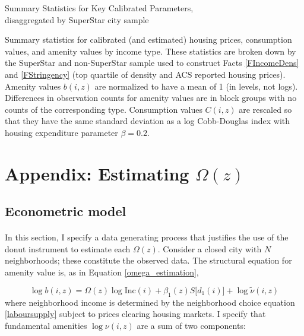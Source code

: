 \documentclass[12pt]{article}
\begin{document}
	\clearpage
	\begin{table}[htbp]
		\caption{Summary Statistics for Key Calibrated Parameters, \\ disaggregated by SuperStar city sample}\label{table:CalibParaSuperstar}
		\makebox[\textwidth]{}
		\caption*{Summary statistics for calibrated (and estimated) housing prices, consumption values, and amenity values by income type. These statistics are broken down by the SuperStar and non-SuperStar sample used to construct Facts \ref{FIncomeDens} and \ref{FStringency} (top quartile of density and ACS reported housing prices). Amenity values $b(i, z)$ are normalized to have a mean of 1 (in levels, not logs). Differences in observation counts for amenity values are in block groups with no counts of the corresponding type. Consumption values $C(i, z)$ are rescaled so that they have the same standard deviation as a log Cobb-Douglas index with housing expenditure parameter $\beta = 0.2$.}
	\end{table}
	
	
	\clearpage
	
	\section{Appendix: Estimating $\Omega(z)$}\label{Appendix:Estimation}
	
	\subsection{Econometric model}\label{Appendix:EconometricModel}
	\paragraph*{}
	In this section, I specify a data generating process that justifies the use of the donut instrument to estimate each $\Omega(z)$. Consider a closed city with $N$ neighborhoods; these constitute the observed data. The structural equation for amenity value is, as in Equation \eqref{omega_estimation},
	
	\begin{equation*}
		\log b(i, z) = \Omega(z) \log \text{Inc}(i) + \beta_{1}(z)S\big[d_{1}(i)\big] + \log \tilde{\nu}(i, z)
	\end{equation*}
	where neighborhood income is determined by the neighborhood choice equation \eqref{laboursupply} subject to prices clearing housing markets. I specify that fundamental amenities $\log \nu(i, z)$ are a sum of two components:
	
\end{document}
